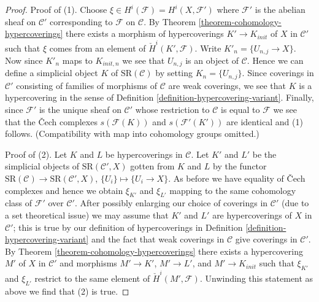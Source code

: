 \documentclass[10pt,a4paper]{amsart}
\theoremstyle{plain}
\theoremstyle{definition}
\theoremstyle{remark}
\numberwithin{equation}{subsection}
\begin{document}
\begin{proof}
\medskip\noindent
Proof of (1). Choose $\xi \in H^i(\mathcal{F}) = H^i(X, \mathcal{F}')$
where $\mathcal{F}'$ is the abelian sheaf on $\mathcal{C}'$ corresponding
to $\mathcal{F}$ on $\mathcal{C}$. By
Theorem \ref{theorem-cohomology-hypercoverings}
there exists a morphism of hypercoverings $K' \to K_{init}$
of $X$ in $\mathcal{C}'$ such that $\xi$ comes from an element
of $\check{H}^i(K', \mathcal{F})$.
Write $K'_n = \{U_{n, j} \to X\}$. Now since $K'_n$ maps to
$K_{init, n}$ we see that $U_{n, j}$ is an object of $\mathcal{C}$.
Hence we can define a simplicial object $K$ of $\text{SR}(\mathcal{C})$
by setting $K_n = \{U_{n, j}\}$. Since coverings in
$\mathcal{C}'$ consisting of families of morphisms of $\mathcal{C}$
are weak coverings, we see that $K$ is a hypercovering in the sense
of Definition \ref{definition-hypercovering-variant}.
Finally, since $\mathcal{F}'$ is the unique sheaf on $\mathcal{C}'$
whose restriction to $\mathcal{C}$ is equal to $\mathcal{F}$
we see that the {\v C}ech complexes $s(\mathcal{F}(K))$
and $s(\mathcal{F}'(K'))$ are identical and (1) follows.
(Compatibility with map into cohomology groups omitted.)

\medskip\noindent
Proof of (2). Let $K$ and $L$ be hypercoverings in $\mathcal{C}$.
Let $K'$ and $L'$ be the simplicial objects of $\text{SR}(\mathcal{C}', X)$
gotten from $K$ and $L$ by the functor
$\text{SR}(\mathcal{C}) \to \text{SR}(\mathcal{C}', X)$,
$\{U_i\} \mapsto \{U_i \to X\}$. As before we have equality of
{\v C}ech complexes and hence we obtain $\xi_{K'}$ and
$\xi_{L'}$ mapping to the same cohomology class of $\mathcal{F}'$
over $\mathcal{C}'$. After possibly enlarging our choice
of coverings in $\mathcal{C}'$ (due to a set theoretical issue)
we may assume that $K'$ and $L'$ are hypercoverings of $X$ in
$\mathcal{C}'$; this is true by our definition of hypercoverings in
Definition \ref{definition-hypercovering-variant} and
the fact that weak coverings in $\mathcal{C}$ give coverings in
$\mathcal{C}'$. By
Theorem \ref{theorem-cohomology-hypercoverings}
there exists a hypercovering $M'$ of $X$ in $\mathcal{C}'$
and morphisms $M' \to K'$, $M' \to L'$, and $M' \to K_{init}$
such that $\xi_{K'}$ and $\xi_{L'}$ restrict to the same element of
$\check{H}^i(M', \mathcal{F})$. Unwinding this statement as above
we find that (2) is true.
\end{proof}
\end{document}
